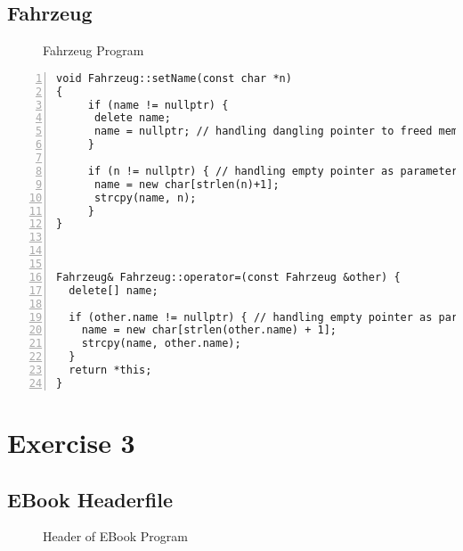 \documentclass{article}
\begin{document}
\subsection{Fahrzeug }
\begin{figure}
  \scriptsize{\caption{Fahrzeug Program}}
\end{figure}
\begin{lstlisting}[basicstyle=\footnotesize\ttfamily, numbers=left, stepnumber=1, numberstyle = \normalsize]
void Fahrzeug::setName(const char *n)
{
     if (name != nullptr) {
      delete name;
      name = nullptr; // handling dangling pointer to freed memory
     }

     if (n != nullptr) { // handling empty pointer as parameter, preventing strlen from crashing
      name = new char[strlen(n)+1];
      strcpy(name, n);
     }
}



Fahrzeug& Fahrzeug::operator=(const Fahrzeug &other) {
  delete[] name;

  if (other.name != nullptr) { // handling empty pointer as parameter, preventing strlen from crashing
    name = new char[strlen(other.name) + 1];
    strcpy(name, other.name);
  }
  return *this;
}

\end{lstlisting}

\newpage
\section{Exercise 3}
\subsection{EBook Headerfile}
\begin{figure}
  \scriptsize{\caption{Header of EBook Program}}
\end{figure}
\end{document}
